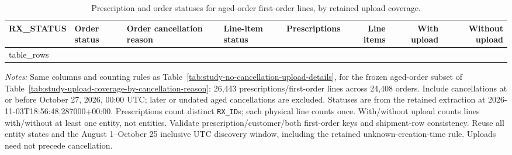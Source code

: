 \begin{table}[!htbp]
\centering
\caption{Prescription and order statuses for aged-order first-order lines, by retained upload coverage.}
\label{tab:study-aged-order-upload-coverage}
\small
\setlength{\tabcolsep}{6pt}
\begin{tabular}{llllrrrr}
\toprule
RX\_STATUS & Order status & Order cancellation reason & Line-item status & Prescriptions & Line items & With upload & Without upload \\
\midrule
{{ table_rows }}
\bottomrule
\end{tabular}
\begin{minipage}{\linewidth}
\footnotesize
\textit{Notes:} Same columns and counting rules as Table~\ref{tab:study-no-cancellation-upload-details},
for the frozen aged-order subset of Table~\ref{tab:study-upload-coverage-by-cancellation-reason}:
26,443 prescriptions/first-order lines across 24,408 orders. Include cancellations
at or before October 27, 2026, 00:00 UTC; later or undated aged cancellations are excluded.
Statuses are from the retained extraction at 2026-11-03T18:56:48.287000+00:00.
Prescriptions count distinct \texttt{RX\_ID}s; each physical line counts once.
With/without upload counts lines with/without at least one entity, not entities.
Validate prescription/customer/both first-order keys and shipment-row consistency.
Reuse all entity states and the August 1--October 25 inclusive UTC discovery window,
including the retained unknown-creation-time rule. Uploads need not precede cancellation.
\end{minipage}
\end{table}
